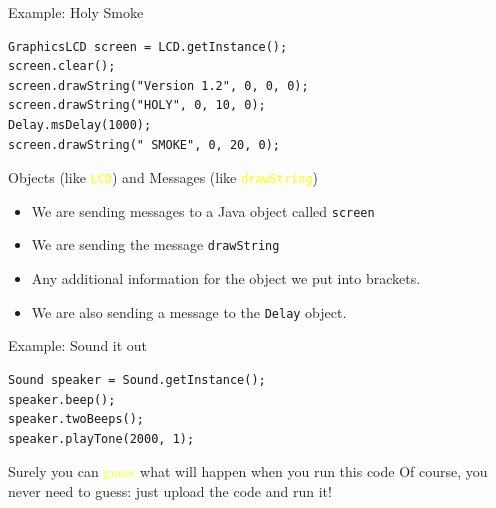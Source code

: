 \documentclass[color=pdftex,usenames,dvipsnames, aspectratio=169]{beamer}
\begin{document}
\begin{frame}[fragile,label=holy]{Example: Holy Smoke}

\begin{lstlisting}[linewidth=12cm,emph={LCD,Delay,screen}]
GraphicsLCD screen = LCD.getInstance();
screen.clear();
screen.drawString("Version 1.2", 0, 0, 0);
screen.drawString("HOLY", 0, 10, 0);
Delay.msDelay(1000);
screen.drawString(" SMOKE", 0, 20, 0);
\end{lstlisting}

\begin{block}{Objects (like \textcolor{yellow}{\Verb!LCD!}) and Messages (like \textcolor{yellow}{\Verb!drawString!})}
\begin{itemize}
\item We are sending messages to a Java object called \lstinline!screen!
\item We are sending the message \lstinline!drawString!
\item Any additional information for the object we put into brackets.
\item We are also sending a message to the \lstinline!Delay! object.
\end{itemize}
\end{block}
\end{frame}

\begin{frame}[fragile,label=soundExample]{Example: Sound it out}
\begin{lstlisting}[linewidth=8cm,emph={Sound,speaker}]
Sound speaker = Sound.getInstance();
speaker.beep();
speaker.twoBeeps();
speaker.playTone(2000, 1);
\end{lstlisting}

\begin{block}{Surely you can \textcolor{yellow}{guess} what will happen when you run this code}
Of course, you never need to guess: just upload the code and run it!
\end{block}
\end{frame}
\end{document}
